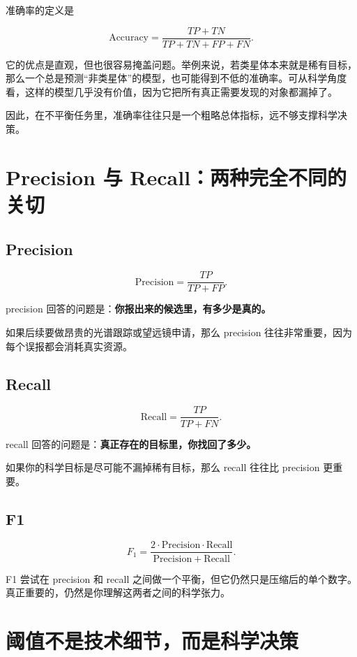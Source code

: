 准确率的定义是

\[
\mathrm{Accuracy} = \frac{TP + TN}{TP + TN + FP + FN}.
\]

它的优点是直观，但也很容易掩盖问题。举例来说，若类星体本来就是稀有目标，那么一个总是预测“非类星体”的模型，也可能得到不低的准确率。可从科学角度看，这样的模型几乎没有价值，因为它把所有真正需要发现的对象都漏掉了。

因此，在不平衡任务里，准确率往往只是一个粗略总体指标，远不够支撑科学决策。

\section{Precision 与 Recall：两种完全不同的关切}

\subsection{Precision}

\[
\mathrm{Precision} = \frac{TP}{TP + FP}.
\]

precision 回答的问题是：\textbf{你报出来的候选里，有多少是真的。}

如果后续要做昂贵的光谱跟踪或望远镜申请，那么 precision 往往非常重要，因为每个误报都会消耗真实资源。

\subsection{Recall}

\[
\mathrm{Recall} = \frac{TP}{TP + FN}.
\]

recall 回答的问题是：\textbf{真正存在的目标里，你找回了多少。}

如果你的科学目标是尽可能不漏掉稀有目标，那么 recall 往往比 precision 更重要。

\subsection{F1}

\[
F_1 =
\frac{2 \cdot \mathrm{Precision} \cdot \mathrm{Recall}}
{\mathrm{Precision} + \mathrm{Recall}}.
\]

F1 尝试在 precision 和 recall 之间做一个平衡，但它仍然只是压缩后的单个数字。真正重要的，仍然是你理解这两者之间的科学张力。

\section{阈值不是技术细节，而是科学决策}

